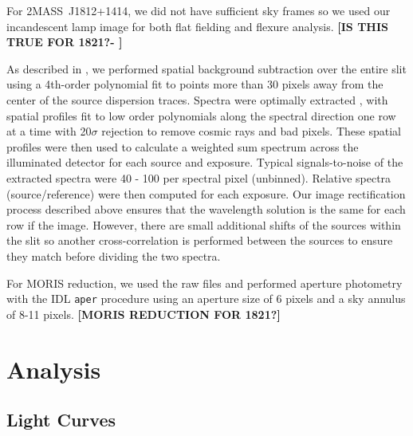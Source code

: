 \documentclass[twocolumn]{aastex6}
\newcommand{\shb}{2MASS~J1812+1414}
\begin{document}
For {\shb}, we did not have sufficient sky frames so we used our incandescent lamp image for both flat fielding and flexure analysis. {\bf [IS THIS TRUE FOR 1821?- \color{red}{YES, there were only 5 good sky frames at the end and 3 at the beginning.}]}

As described in \citet{2016ApJ...826..156S}, we performed spatial background subtraction over the entire slit using a 4th-order polynomial fit to points more than 30 pixels away from the center of the source dispersion traces.  Spectra were optimally extracted \citep{1986ApJ...302..757H}, with spatial profiles fit to low order polynomials along the spectral direction one row at a time with 20$\sigma$ rejection to remove cosmic rays and bad pixels.
These spatial profiles were then used to calculate a weighted sum spectrum across the illuminated detector for each source and exposure. 
Typical signals-to-noise of the extracted spectra were 40 - 100 per spectral pixel (unbinned).
Relative spectra (source/reference) were then computed for each exposure.
Our image rectification process described above ensures that the wavelength solution is the same for each row if the image.
However, there are small additional shifts of the sources within the slit so another cross-correlation is performed between the sources to ensure they match before dividing the two spectra.

For MORIS reduction, we used the raw files and performed aperture photometry with the IDL \texttt{aper} procedure using an aperture size of 6 pixels and a sky annulus of 8-11 pixels.
{\bf [MORIS REDUCTION FOR 1821?]}

\section{Analysis}\label{sec:analysis}

\subsection{Light Curves}
\end{document}
